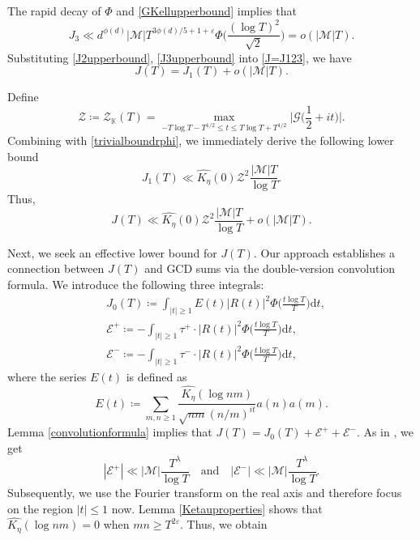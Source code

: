 \documentclass[12pt,reqno]{amsart}
\theoremstyle{definition}
\numberwithin{equation}{section}
\newcommand{\mbk}{\mathbb{K}}
\newcommand{\mce}{\mathcal{E}}
\newcommand{\mcg}{\mathcal{G}}
\newcommand{\mcm}{\mathcal{M}}
\newcommand{\mcz}{\mathcal{Z}}
\begin{document}
The rapid decay of $\Phi$ and \eqref{GKellupperbound} implies that
\begin{equation}
    \label{J3upperbound}
    J_3 \ll d^{\phi(d)}|\mcm| T^{3\phi(d)/5+1+\varepsilon} \Phi \Big(\frac{(\log T)^2}{\sqrt{2}}\Big)=o(|\mcm|T).
\end{equation}
Substituting \eqref{J2upperbound}, \eqref{J3upperbound} into \eqref{J=J123}, we have
\begin{equation}
    \label{JJ1+o}
    J(T) = J_1 (T) + o(|\mcm|T) .
\end{equation}
\par
Define
$$
\mcz \coloneqq \mcz_\mbk(T)= \max_{-T \log T - T^{1/2}\le t\le T \log T+T^{1/2}}\Big|\mcg\Big(\frac{1}{2}+it\Big)\Big|.
$$
Combining with \eqref{trivialboundrphi}, we immediately derive the following lower bound
\begin{equation}
    \label{J1upperbound}
    J_1(T) \ll \widehat{K_{\eta}}(0) \mcz^2 \frac{|\mcm|T}{\log T}.
\end{equation}
Thus, 
\begin{equation}
    \label{Jupperbound}
    J(T) \ll \widehat{K_{\eta}}(0) \mcz^2 \frac{|\mcm|T}{\log T} +  o (|\mcm|T).
\end{equation}
\par
Next, we seek an effective lower bound for $J(T)$. Our approach establishes a connection between $J(T)$ and GCD sums via the double-version convolution formula. We introduce the following three integrals:
\begin{align*}
&J_0(T)\coloneqq \int_{|t|\ge 1}E(t)|R(t)|^{2}\Phi\Big(\frac{t\log T}{T}\Big)\mathrm{d}t, \\
&\mce^+\coloneqq -\int_{|t|\ge 1}\tau^{+}\cdot|R(t)|^{2}\Phi\Big( \frac{t\log T}{T}\Big)\mathrm{d}t, \\
&\mce^-\coloneqq -\int_{|t|\ge 1}\tau^{-}\cdot|R(t)|^{2}\Phi\Big( \frac{t\log T}{T}\Big)\mathrm{d}t,
\end{align*}
where the series $E(t)$ is defined as 
\begin{equation}
    \label{EKtseriesdefinition}
E(t)\coloneqq \sum_{m,n\ge1}\frac{\widehat{K_{\eta}}(\log nm)}{\sqrt{nm}(n/m)^{it}}a(n)a(m).
\end{equation}
Lemma \ref{convolutionformula} implies that $J(T)=J_0(T)+\mce^+ +\mce^-.$ As in \cite[pp. 14-15]{yang2022note}, we get
$$
|\mce^+|\ll|\mcm| \frac{T^{\lambda}}{\log T} \quad \text{and} \quad |\mce^-|\ll|\mcm| \frac{T^{\lambda}}{\log T}.
$$
Subsequently, we use the Fourier transform on the real axis and therefore focus on the region $|t| \le 1$ now. Lemma \ref{Ketauproperties} shows that $\widehat{K_{\eta}}(\log nm)=0$ when $mn\ge T^{2\varepsilon}$. Thus, we obtain
\end{document}
